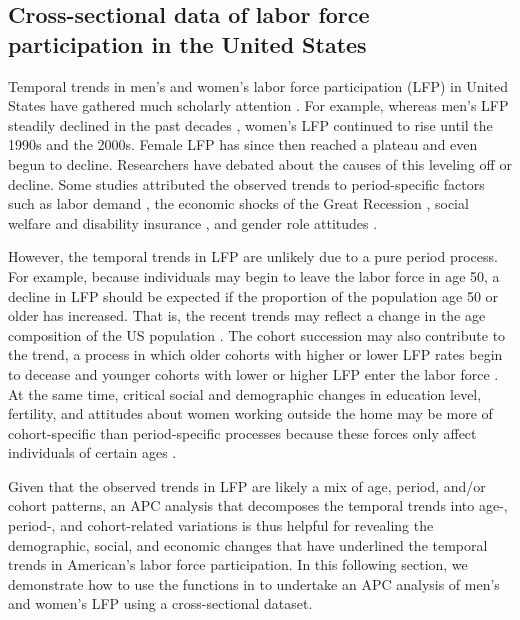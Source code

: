 \subsection{Cross-sectional data of labor force participation in the United States} \label{example1}

Temporal trends in men's and women’s labor force participation (LFP) in United States have gathered much scholarly attention \citep[see e.g.][]{connellyEffectChildCare1992, farkas1977cohort, hollisterUnmaskingConflictingTrends2014, macunovichRelativeCohortSize2012, treasEffectWomenLabor1987, wilkieDeclineMenLabor1991a}. For example, whereas men's LFP steadily declined in the past decades \citep{wilkieDeclineMenLabor1991a}, women’s LFP continued to rise until the 1990s and the 2000s. Female LFP has since then reached a plateau and even begun to decline. Researchers have debated about the causes of this leveling off or decline. Some studies attributed the observed trends to period-specific factors such as labor demand \citep{ercegLaborForceParticipation2014}, the economic shocks of the Great Recession \citep{ bousheyAreWomenOpting, hoffman2009changing}, social welfare and disability insurance \citep{duggan200911}, and gender role attitudes \citep{fortinGenderRoleAttitudes2015}.

However, the temporal trends in LFP are unlikely due to a pure period process. For example, because individuals may begin to leave the labor force in age 50, a decline in LFP should be expected if the proportion of the population age 50 or older has increased. That is, the recent trends may reflect a change in the age composition of the US population \citep{aaronsonLaborForceParticipation2014}. The cohort succession may also contribute to the trend, a process in which older cohorts with higher or lower LFP rates begin to decease and younger cohorts with lower or higher LFP enter the labor force \citet{lee_plateau_2014}. At the same time, critical social and demographic changes in education level, fertility, and attitudes about women working outside the home may be more of cohort-specific than period-specific processes because these forces only affect individuals of certain ages \citep{balleerLabourForceParticipation2014, farreIntergenerationalTransmissionGender2013, fernandezCulturalChangeLearning2013, goldin_quiet_2006}.

Given that the observed trends in LFP are likely a mix of age, period, and/or cohort patterns, an APC analysis that decomposes the temporal trends into age-, period-, and cohort-related variations is thus helpful for revealing the demographic, social, and economic changes that have underlined the temporal trends in American's labor force participation. In this following section, we demonstrate how to use the functions in  to undertake an APC analysis of men's and women’s LFP using a cross-sectional dataset.    

